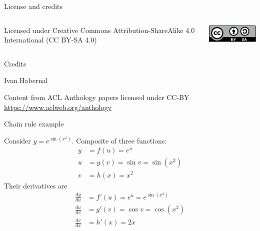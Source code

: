 \documentclass[12pt,aspectratio=169,handout]{beamer}
\begin{document}
\begin{frame}{License and credits}
	
	\begin{columns}
		\begin{column}{0.7\textwidth}
			Licensed under Creative Commons Attribution-ShareAlike 4.0 International (CC BY-SA 4.0)
		\end{column}
		\begin{column}{0.2\textwidth}
			\includegraphics[width=0.9\linewidth]{img/cc-by-sa-icon.pdf}
		\end{column}
	\end{columns}
	
	\bigskip
	
	Credits
	
	\begin{scriptsize}
		
		Ivan Habernal
		
		Content from ACL Anthology papers licensed under CC-BY \url{https://www.aclweb.org/anthology}
		
	\end{scriptsize}
	
\end{frame}

\appendix

\begin{frame}{Chain rule example}
	
	Consider $y=e^{\sin(x^{2})}$. Composite of three functions:
	$$
	\begin{aligned}
		y &= f(u) = e^u \\
		u &= g(v) = \sin v = \sin (x^2) \\
		v &= h(x) = x^2
	\end{aligned}
	$$
	\pause
	Their derivatives are
	$$
	\begin{aligned}
		\frac{dy}{du} &= f'(u) = e^u = e^{\sin(x^{2})} \\
		\frac{du}{dv} &= g'(v) = \cos v = \cos (x^2) \\
		\frac{dv}{dx} &= h'(x) = 2x
	\end{aligned}
	$$
\end{frame}
\end{document}
